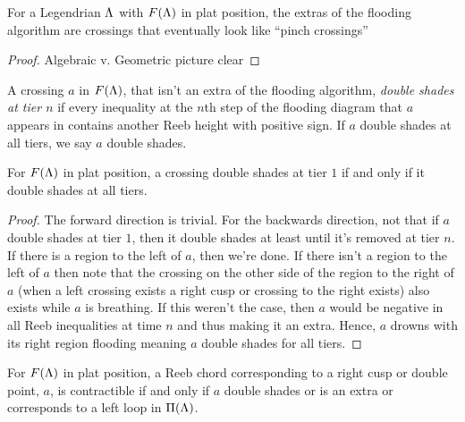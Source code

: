 \documentclass[11pt,oneside]{amsart}
\begin{document}
\begin{lemma}
    \label{lem:extradesc}
    For a Legendrian $\Lambda$ with $F(\Lambda)$ in plat position, the extras of the flooding algorithm are crossings that eventually look like ``pinch crossings''
\end{lemma}
\begin{proof}
    Algebraic v. Geometric picture clear \TODO
\end{proof}

\begin{definition}
    \label{def:doubleshade}
    A crossing $a$ in $F(\Lambda)$, that isn't an extra of the flooding algorithm, \textit{double shades at tier $n$} if every inequality at the $n$th step of the flooding diagram that $a$ appears in contains another Reeb height with positive sign. If $a$ double shades at all tiers, we say $a$ double shades.
\end{definition}


\begin{lemma}
    \label{lem:doubleshadecrit}
        For $F(\Lambda)$ in plat position, a crossing double shades at tier $1$ if and only if it double shades at all tiers.
\end{lemma}
\begin{proof}
    The forward direction is trivial. For the backwards direction, not that if $a$ double shades at tier $1$, then it double shades at least until it's removed at tier $n$. If there is a region to the left of $a$, then we're done. If there isn't a region to the left of $a$ then note that the crossing on the other side of the region to the right of $a$ (when a left crossing exists a right cusp or crossing to the right exists) also exists while $a$ is breathing. If this weren't the case, then $a$ would be negative in all Reeb inequalities at time $n$ and thus making it an extra. Hence, $a$ drowns with its right region flooding meaning $a$ double shades for all tiers.
\end{proof}

\begin{proposition}
    \label{prop:contractdesc}
    For $F(\Lambda)$ in plat position, a Reeb chord corresponding to a right cusp or double point, $a$, is contractible if and only if $a$ double shades or is an extra or corresponds to a left loop in $\Pi(\Lambda)$.
\end{proposition}
\end{document}
